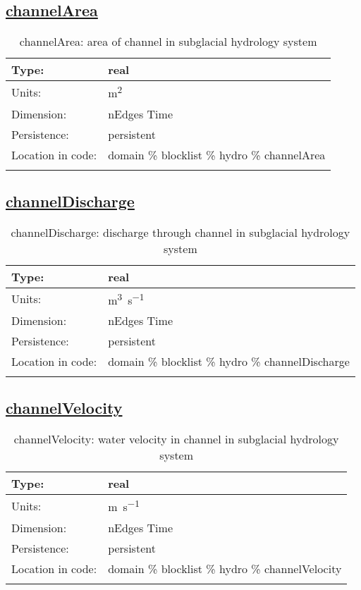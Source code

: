 \subsection[channelArea]{\hyperref[sec:var_tab_hydro]{channelArea}}
\label{subsec:var_sec_hydro_channelArea}
\begin{center}
\begin{longtable}{| p{2.0in} | p{4.0in} |}
        \hline 
        Type: & real \\
        \hline 
        Units: & \si{m^{2}} \\
        \hline 
        Dimension: & nEdges Time \\
        \hline 
        Persistence: & persistent \\
        \hline 
         Location in code: & domain \% blocklist \% hydro \% channelArea \\
         \hline 
    \caption{channelArea: area of channel in subglacial hydrology system}
\end{longtable}
\end{center}
\subsection[channelDischarge]{\hyperref[sec:var_tab_hydro]{channelDischarge}}
\label{subsec:var_sec_hydro_channelDischarge}
\begin{center}
\begin{longtable}{| p{2.0in} | p{4.0in} |}
        \hline 
        Type: & real \\
        \hline 
        Units: & \si{m^{3}.s^{-1}} \\
        \hline 
        Dimension: & nEdges Time \\
        \hline 
        Persistence: & persistent \\
        \hline 
         Location in code: & domain \% blocklist \% hydro \% channelDischarge \\
         \hline 
    \caption{channelDischarge: discharge through channel in subglacial hydrology system}
\end{longtable}
\end{center}
\subsection[channelVelocity]{\hyperref[sec:var_tab_hydro]{channelVelocity}}
\label{subsec:var_sec_hydro_channelVelocity}
\begin{center}
\begin{longtable}{| p{2.0in} | p{4.0in} |}
        \hline 
        Type: & real \\
        \hline 
        Units: & \si{m.s^{-1}} \\
        \hline 
        Dimension: & nEdges Time \\
        \hline 
        Persistence: & persistent \\
        \hline 
         Location in code: & domain \% blocklist \% hydro \% channelVelocity \\
         \hline 
    \caption{channelVelocity: water velocity in channel in subglacial hydrology system}
\end{longtable}
\end{center}
